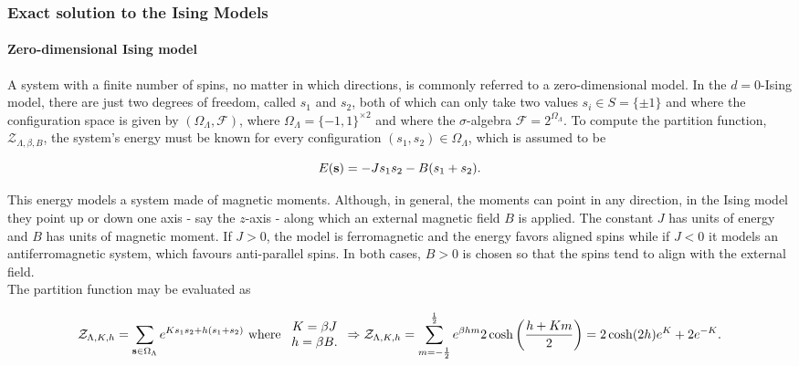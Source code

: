 \documentclass{homework}
\begin{document}
\subsubsection{Exact solution to the Ising Models}

\paragraph{\textbf{Zero-dimensional Ising model}}

A system with a finite number of spins, no matter in which directions, is commonly referred to a zero-dimensional model. In the $d=0$-Ising model, there are just two degrees of freedom, called $s_1$ and $s_2$, both of which can only take two values $s_i \in S = \{\pm 1\}$ and where the configuration space is given by $(\Omega_\Lambda, \mathcal{F})$, where $\Omega_\Lambda = \{-1, 1\}^{\times 2}$ and where the $\sigma$-algebra $\mathcal{F} = 2^{\Omega_\Lambda}$. To compute the partition function, $\mathcal{Z}_{\Lambda, \beta, B}$, the system's energy must be known for every configuration $(s_1, s_2) \in \Omega_{\Lambda}$, which is assumed to be 

\begin{equation}
    E({\bf s}) = - J s_1 s_2 - B(s_1+s_2).
\end{equation}

This energy models a system made of magnetic moments. Although, in general, the moments can point in any direction, in the Ising model they point up or down one axis - say the $z$-axis - along which an external magnetic field $B$ is applied. The constant $J$ has units of energy and $B$ has units of magnetic moment. If $J>0$, the model is ferromagnetic and the energy favors aligned spins while if $J<0$ it models an antiferromagnetic system, which favours anti-parallel spins. In both cases, $B>0$ is chosen so that the spins tend to align with the external field. \\

The partition function may be evaluated as 

\begin{equation}
    \mathcal{Z}_{\Lambda, K, h} = \sum_{{\bf s} \in \Omega_{\Lambda}} e^{K s_1 s_2 + h(s_1+s_2)} \textnormal{ where } \begin{array}{c}
         K = \beta J  \\
         h = \beta B.
    \end{array} \Rightarrow 
    \mathcal{Z}_{\Lambda, K, h}  = \sum_{m=-\frac{1}{2}}^{\frac{1}{2}} e^{\beta h m} 2 \cosh\bigg(\frac{h + Km}{2}\bigg) = 2 \cosh(2h) e^{K} + 2e^{-K}.
\end{equation}
\end{document}
